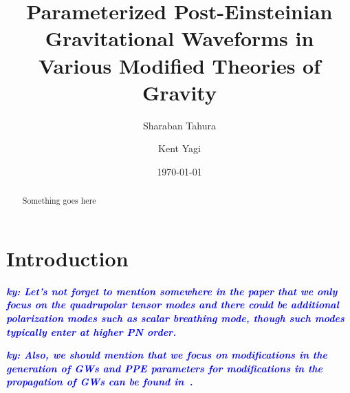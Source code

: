 \documentclass[prd,twocolumn,nofootinbib]{revtex4-1}
\newcommand{\ky}[1]{\textcolor{blue}{\it{\textbf{ky: #1}}} }
\begin{document}
\title{Parameterized Post-Einsteinian Gravitational Waveforms in \\ Various Modified Theories of Gravity}

\author{Sharaban Tahura}

\author{Kent Yagi}

\begin{abstract} 

Something goes here 

\end{abstract}

\date{\today}




\maketitle


\section{Introduction}
\ky{Let's not forget to mention somewhere in the paper that we only focus on the quadrupolar tensor modes and there could be additional polarization modes such as scalar breathing mode, though such modes typically enter at higher PN order.}

\ky{Also, we should mention that we focus on modifications in the generation of GWs and PPE parameters for modifications in the propagation of GWs can be found in~\cite{Mirshekari:2011yq,Yunes:2016jcc,Nishizawa:2017nef}.}
\end{document}

